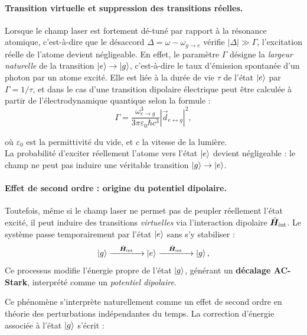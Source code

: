 \paragraph{Transition virtuelle et suppression des transitions réelles.}
Lorsque le champ laser est fortement dé-tuné par rapport à la résonance atomique, c’est-à-dire que le désaccord \( \Delta = \omega - \omega_{g\rightarrow e} \) vérifie \( |\Delta| \gg \Gamma \), l’excitation réelle de l’atome devient négligeable. En effet, le paramètre \( \Gamma \) désigne la \emph{largeur naturelle} de la transition \( \ket{e} \rightarrow \ket{g} \), c’est-à-dire le taux d’émission spontanée d’un photon par un atome excité. Elle est liée à la durée de vie \( \tau \) de l’état \( \ket{e} \) par \( \Gamma = 1/\tau \), et  dans le cas d’une transition dipolaire électrique  peut être calculée à partir de l’électrodynamique quantique selon la formule :
\begin{equation}
	\Gamma = \frac{\omega_{e\rightarrow g}^3}{3 \pi \varepsilon_0 \hbar c^3} |\vec{d}_{e \leftrightarrow g } |^2,
\end{equation}

où \( \varepsilon_0 \) est la permittivité du vide, et \( c \) la vitesse de la lumière.\\La probabilité d’exciter réellement l’atome vers l’état \( \ket{e} \) devient négligeable : le champ ne peut pas induire une véritable transition \( \ket{g} \to \ket{e} \).\\


\bigskip

\paragraph{Effet de second ordre : origine du potentiel dipolaire.}

\noindent Toutefois, même si le champ laser ne permet pas de peupler réellement l’état excité, il peut induire des transitions \emph{virtuelles} via l’interaction dipolaire \(  \hat{\bm{H}}_{\text{int}} \). Le système passe temporairement par l’état \( \ket{e} \) sans s’y stabiliser :
\[
\ket{g} \xrightarrow{\quad \hat{\bm{H}}_{\text{int}} \quad} \ket{e} \xrightarrow{\quad \hat{\bm{H}}_{\text{int}} \quad} \ket{g},
\]
Ce processus modifie l’énergie propre de l’état \( \ket{g} \), générant un \textbf{décalage AC-Stark}, interprété comme un \emph{potentiel dipolaire}.


Ce phénomène s’interprète naturellement comme un effet de second ordre en théorie des perturbations indépendantes du temps. La correction d’énergie associée à l’état \( \ket{g} \) s’écrit :

